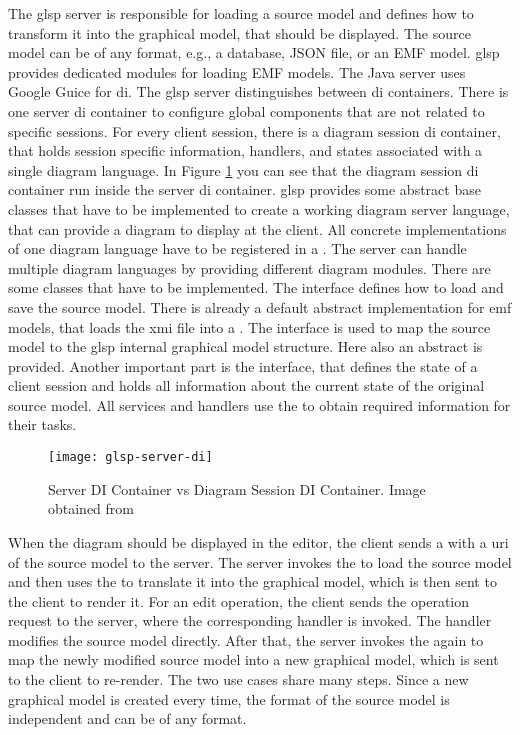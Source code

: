   The \ac{glsp} server is responsible for loading a source model and defines how to transform it into the graphical model, that should be displayed. The source model can be of any format, e.g., a database, JSON file, or an EMF model. \ac{glsp} provides dedicated modules for loading EMF models. The Java server uses Google Guice \cite{guice-repo} for \ac{di}. The \ac{glsp} server distinguishes between \ac{di} containers. There is one server \ac{di} container to configure global components that are not related to specific sessions. For every client session, there is a diagram session \ac{di} container, that holds session specific information, handlers, and states associated with a single diagram language. In Figure \ref{fig:glsp-server-di} you can see that the diagram session \ac{di} container run inside the server \ac{di} container. \ac{glsp} provides some abstract base classes that have to be implemented to create a working diagram server language, that can provide a diagram to display at the client. All concrete implementations of one diagram language have to be registered in a . The server can handle multiple diagram languages by providing different diagram modules. There are some classes that have to be implemented. The interface  defines how to load and save the source model. There is already a default abstract implementation for \ac{emf} models, that loads the \ac{xmi} file into a . The interface  is used to map the source model to the \ac{glsp} internal graphical model structure. Here also an abstract  is provided. Another important part is the  interface, that defines the state of a client session and holds all information about the current state of the original source model. All services and handlers use the  to obtain required information for their tasks.

   \begin{figure}[h]
    \centering
    \texttt{[image: glsp-server-di]}
    \caption{Server DI Container vs Diagram Session DI Container. Image obtained from \cite{glsp-doc}}
    \label{fig:glsp-server-di}
  \end{figure}

  When the diagram should be displayed in the editor, the client sends a  with a \acs{uri} of the source model to the server. The server invokes the  to load the source model and then uses the  to translate it into the graphical model, which is then sent to the client to render it. For an edit operation, the client sends the operation request to the server, where the corresponding handler is invoked. The handler modifies the source model directly. After that, the server invokes the  again to map the newly modified source model into a new graphical model, which is sent to the client to re-render. The two use cases share many steps. Since a new graphical model is created every time, the format of the source model is independent and can be of any format. \cite{glsp-doc}

